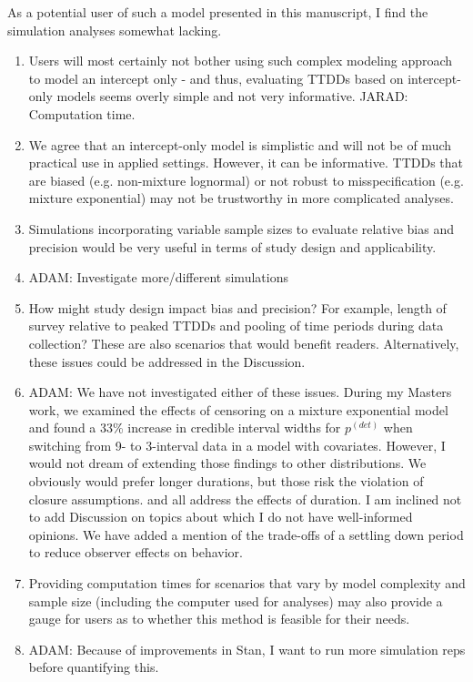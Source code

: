 \documentclass[12pt]{article}
\renewenvironment{quote}  %
              {\list{}{\rightmargin\leftmargin}\normalfont%
               \item\relax}
              {\endlist}
\newcommand{\adam}[1]{{\color{blue} ADAM: #1}}
\newcommand{\jarad}[1]{{\color{Orange} JARAD: #1}}
\newcommand{\pdet}{p^{(det)}}
\begin{document}
As a potential user of such a model presented in this manuscript, I find the simulation analyses somewhat lacking.   
\begin{enumerate}
\item Users will most certainly not bother using such complex modeling approach to model an intercept only - and thus, evaluating TTDDs based on intercept-only models seems overly simple and not very informative. \jarad{Computation time.}
\begin{quote}
We agree that an intercept-only model is simplistic and will not be of much practical use in applied settings.
However, it can be informative.
TTDDs that are biased (e.g. non-mixture lognormal) or not robust to misspecification (e.g. mixture exponential) may not be trustworthy in more complicated analyses.
\end{quote}
\item Simulations incorporating variable sample sizes to evaluate relative bias and precision would be very useful in terms of study design and applicability.  
\begin{quote}
\adam{Investigate more/different simulations}
\end{quote}
\item How might study design impact bias and precision?  For example, length of survey relative to peaked TTDDs and pooling of time periods during data collection?  These are also scenarios that would benefit readers.  Alternatively, these issues could be addressed in the Discussion.
\begin{quote}
\adam{We have not investigated either of these issues.
During my Masters work, we examined the effects of censoring on a mixture exponential model and found a 33\% increase in credible interval widths for $\pdet$ when switching from 9- to 3-interval data in a model with covariates.
However, I would not dream of extending those findings to other distributions.
We obviously would prefer longer durations, but those risk the violation of closure assumptions.
\citet{Petit1995, Johnson2008, LeeMarsden2008} and \citet{Reidy2011} all address the effects of duration.
I am inclined not to add Discussion on topics about which I do not have well-informed opinions.
}
We have added a mention of the trade-offs of a settling down period to reduce observer effects on behavior.
\end{quote}

\item Providing computation times for scenarios that vary by model complexity and sample size (including the computer used for analyses) may also provide a gauge for users as to whether this method is feasible for their needs.
\begin{quote}
\adam{Because of improvements in Stan, I want to run more simulation reps before quantifying this.}
\end{quote}


\end{enumerate}
\end{document}
